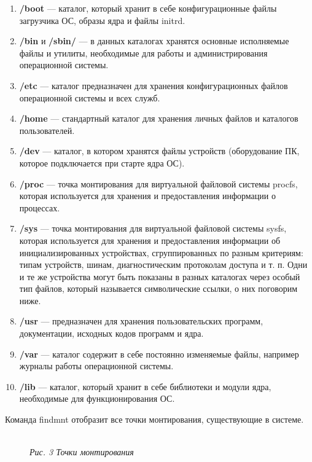 \documentclass[14pt, a4paper]{article}
\begin{document}
\begin{enumerate}
    \item \textbf{/boot} — каталог, который хранит в себе конфигурационные файлы загрузчика ОС, образы
    ядра и файлы initrd.
    \item \textbf{/bin} и \textbf{/sbin/} — в данных каталогах хранятся основные исполняемые файлы и утилиты,
    необходимые для работы и администрирования операционной системы.
    \item \textbf{/etc} — каталог предназначен для хранения конфигурационных файлов операционной системы
    и всех служб.
    \item \textbf{/home} — стандартный каталог для хранения личных файлов и каталогов пользователей.
    \item \textbf{/dev} — каталог, в котором хранятся файлы устройств (оборудование ПК, которое
    подключается при старте ядра ОС).
    \item \textbf{/proc} — точка монтирования для виртуальной файловой системы procfs, которая используется
    для хранения и предоставления информации о процессах.
    \item \textbf{/sys} — точка монтирования для виртуальной файловой системы sysfs, которая используется
    для хранения и предоставления информации об инициализированных устройствах,
    сгруппированных по разным критериям: типам устройств, шинам, диагностическим протоколам
    доступа и т. п. Одни и те же устройства могут быть показаны в разных каталогах через особый
    тип файлов, который называется символические ссылки, о них поговорим ниже.
    \item \textbf{/usr} — предназначен для хранения пользовательских программ, документации, исходных
    кодов программ и ядра.
    \item \textbf{/var} — каталог содержит в себе постоянно изменяемые файлы, например журналы работы
    операционной системы.
    \item \textbf{/lib} — каталог, который хранит в себе библиотеки и модули ядра, необходимые для
    функционирования ОС.
\end{enumerate}

Команда \colorbox{backcolour}{findmnt} отобразит все точки монтирования, существующие в системе.

\begin{figure}[h]
    \centering
    \\ 
    \small\textit{Рис. 3 Точки монтирования}  
    \label{framework} 
\end{figure}
\end{document}
